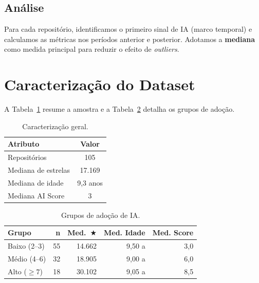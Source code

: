 \documentclass[12pt,a4paper,twocolumn]{article}
\begin{document}
\subsection{Análise}

Para cada repositório, identificamos o primeiro sinal de IA (marco temporal) e
calculamos as métricas nos períodos anterior e posterior. Adotamos a \textbf{mediana}
como medida principal para reduzir o efeito de \textit{outliers}.

\section{Caracterização do Dataset}

A Tabela~\ref{tab:dataset} resume a amostra e a Tabela~\ref{tab:grupos} detalha os
grupos de adoção.

\begin{table}[t]
\centering\caption{Caracterização geral.}\label{tab:dataset}
\small
\begin{tabular}{lc}
\toprule
\textbf{Atributo} & \textbf{Valor} \\
\midrule
Repositórios       & 105 \\
Mediana de estrelas & 17.169 \\
Mediana de idade   & 9,3 anos \\
Mediana AI Score   & 3 \\
\bottomrule
\end{tabular}
\end{table}

\begin{table}[t]
\centering\caption{Grupos de adoção de IA.}\label{tab:grupos}
\small\setlength{\tabcolsep}{4pt}
\begin{tabular}{lrrrr}
\toprule
\textbf{Grupo} & \textbf{n} & \textbf{Med.~$\bigstar$} & \textbf{Med. Idade} & \textbf{Med. Score} \\
\midrule
Baixo (2--3) & 55 & 14.662 & 9,50 a & 3,0 \\
Médio (4--6) & 32 & 18.905 & 9,00 a & 6,0 \\
Alto ($\geq 7$) & 18 & 30.102 & 9,05 a & 8,5 \\
\bottomrule
\end{tabular}
\end{table}
\end{document}
